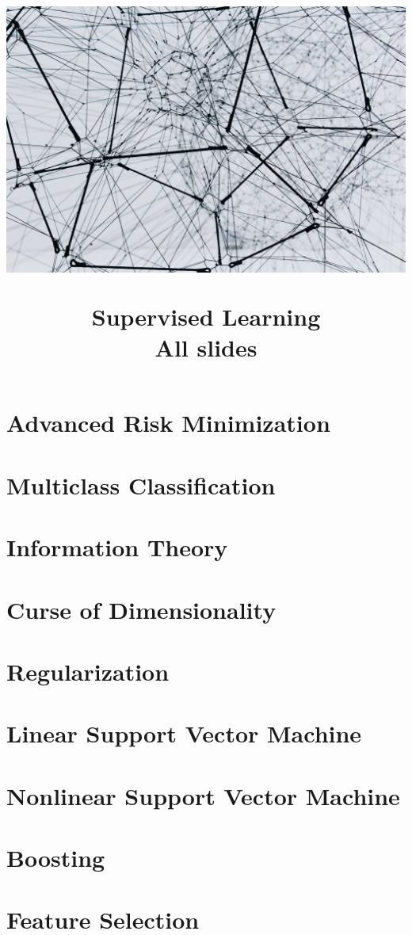 \documentclass[11pt,compress]{beamer}
\title{
  \hspace{-0.5cm}\centerline{\includegraphics[width=1.05\paperwidth,keepaspectratio, trim={0 15cm 0 5cm}, clip]{titlepage.jpg}}
  \medskip
  Supervised Learning \\
  \medskip
  \small All slides
  \vspace{-1.5cm}
}
\begin{document}

\begin{frame}
\maketitle
\end{frame}



\section{Advanced Risk Minimization}


\section{Multiclass Classification}


\section{Information Theory}


\section{Curse of Dimensionality}


%

\section{Regularization}


\section{Linear Support Vector Machine}


\section{Nonlinear Support Vector Machine}


%

\section{Boosting}


\section{Feature Selection}

\end{document}
